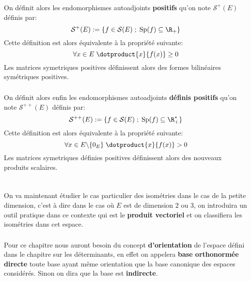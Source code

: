 \subsection*{}
On définit alors les endomorphismes autoadjoints \textbf{positifs} qu'on note \(\mathcal{S}^+(E)\) définis par:
\[
   \mathcal{S}^+(E) := \{ f \in \mathcal{S}(E) \; ; \; \text{Sp}(f) \subseteq \R_+ \}  
\]
Cette définition est alors équivalente à la propriété suivante:
\[
   \forall x \in E \; \dotproduct{x}{f(x)} \geq 0
\]
Les matrices symetriques positives définissent alors des formes bilinéaires symétriques positives.
\subsection*{}
On définit alors enfin les endomorphismes autoadjoints \textbf{définis positifs} qu'on note \(\mathcal{S}^{++}(E)\) définis par:
\[
   \mathcal{S}^{++}(E) := \{ f \in \mathcal{S}(E) \; ; \; \text{Sp}(f) \subseteq \R_+^* \}  
\]
Cette définition est alors équivalente à la propriété suivante:
\[
   \forall x \in E\backslash\{0_E\} \; \dotproduct{x}{f(x)} > 0 
\]
Les matrices symetriques définies positives définissent alors des nouveaux produits scalaires.
\chapter*{}
On va maintenant étudier le cas particulier des isométries dans le cas de la petite dimension, c'est à dire dans le cas où \(E\) est de dimension \(2\) ou \(3\), on introduira un outil pratique dans ce contexte qui est le \textbf{produit vectoriel} et on classifiera les isométries dans cet espace.

\subsection*{}
Pour ce chapitre nous auront besoin du concept \textbf{d'orientation} de l'espace défini dans le chapitre sur les déterminants, en effet on appelera \textbf{base orthonormée directe} toute base ayant même orientation que la base canonique des espaces considérés. Sinon on dira que la base est \textbf{indirecte}.


